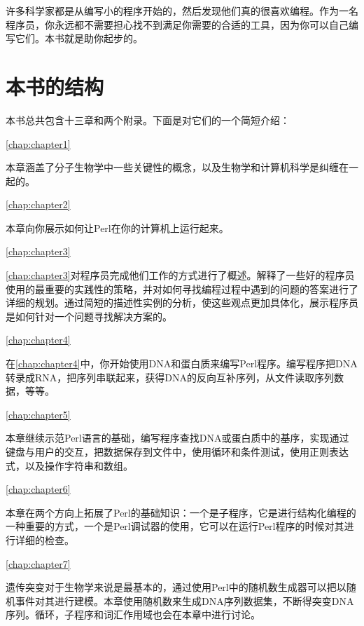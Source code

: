 许多科学家都是从编写小的程序开始的，然后发现他们真的很喜欢编程。作为一名程序员，你永远都不需要担心找不到满足你需要的合适的工具，因为你可以自己编写它们。本书就是助你起步的。

\section*{本书的结构}
本书总共包含十三章和两个附录。下面是对它们的一个简短介绍：

\autoref{chap:chapter1}
\begin{adjustwidth}{4em}{0cm}
本章涵盖了分子生物学中一些关键性的概念，以及生物学和计算机科学是纠缠在一起的。
\end{adjustwidth}

\autoref{chap:chapter2}
\begin{adjustwidth}{4em}{0cm}
本章向你展示如何让Perl在你的计算机上运行起来。
\end{adjustwidth}

\autoref{chap:chapter3}
\begin{adjustwidth}{4em}{0cm}
\autoref{chap:chapter3}对程序员完成他们工作的方式进行了概述。解释了一些好的程序员使用的最重要的实践性的策略，并对如何寻找编程过程中遇到的问题的答案进行了详细的规划。通过简短的描述性实例的分析，使这些观点更加具体化，展示程序员是如何针对一个问题寻找解决方案的。
\end{adjustwidth}

\autoref{chap:chapter4}
\begin{adjustwidth}{4em}{0cm}
在\autoref{chap:chapter4}中，你开始使用DNA和蛋白质来编写Perl程序。编写程序把DNA转录成RNA，把序列串联起来，获得DNA的反向互补序列，从文件读取序列数据，等等。
\end{adjustwidth}

\autoref{chap:chapter5}
\begin{adjustwidth}{4em}{0cm}
本章继续示范Perl语言的基础，编写程序查找DNA或蛋白质中的基序，实现通过键盘与用户的交互，把数据保存到文件中，使用循环和条件测试，使用正则表达式，以及操作字符串和数组。
\end{adjustwidth}

\autoref{chap:chapter6}
\begin{adjustwidth}{4em}{0cm}
本章在两个方向上拓展了Perl的基础知识：一个是子程序，它是进行结构化编程的一种重要的方式，一个是Perl调试器的使用，它可以在运行Perl程序的时候对其进行详细的检查。
\end{adjustwidth}

\autoref{chap:chapter7}
\begin{adjustwidth}{4em}{0cm}
遗传突变对于生物学来说是最基本的，通过使用Perl中的随机数生成器可以把以随机事件对其进行建模。本章使用随机数来生成DNA序列数据集，不断得突变DNA序列。循环，子程序和词汇作用域也会在本章中进行讨论。
\end{adjustwidth}

